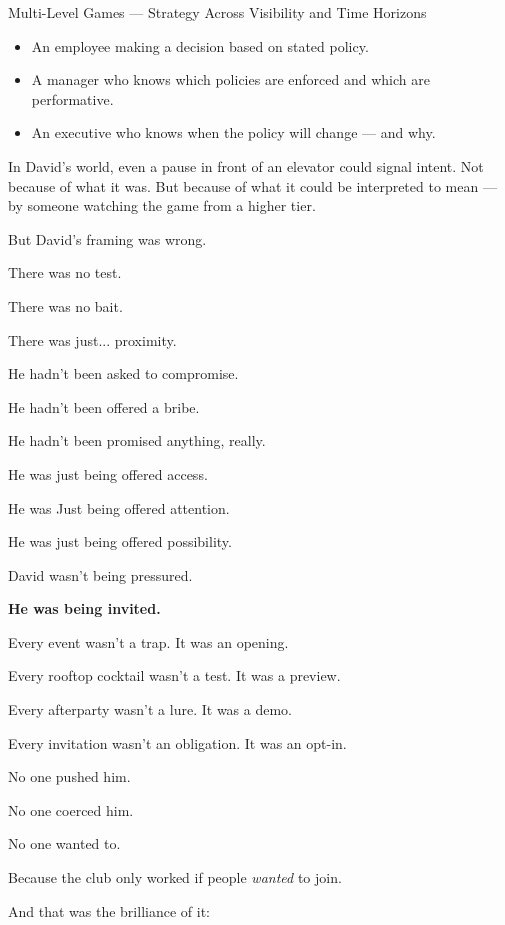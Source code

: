 \begin{TechnicalSidebar}{Multi-Level Games --- Strategy Across Visibility and Time Horizons}
    \begin{itemize}
        \item An employee making a decision based on stated policy.
        \item A manager who knows which policies are enforced and which are performative.
        \item An executive who knows when the policy will change — and why.
    \end{itemize}
    
    \medskip
    
    In David’s world, even a pause in front of an elevator could signal intent.  
    Not because of what it was.  
    But because of what it could be interpreted to mean — by someone watching the game from a higher tier.
    
\end{TechnicalSidebar}

\medskip

But David's framing was wrong.

There was no test.

There was no bait.

There was just... proximity.

He hadn’t been asked to compromise.

He hadn’t been offered a bribe.

He hadn’t been promised anything, really.

He was just being offered access.

He was Just being offered attention.

He was just being offered possibility.

David wasn't being pressured. 

\textbf{He was being invited.}

Every event wasn’t a trap. It was an opening.

Every rooftop cocktail wasn’t a test. It was a preview.  

Every afterparty wasn’t a lure. It was a demo.  

Every invitation wasn’t an obligation. It was an opt-in.

No one pushed him. 

No one coerced him. 

No one wanted to. 

Because the club only worked if people \textit{wanted} to join.

And that was the brilliance of it:

